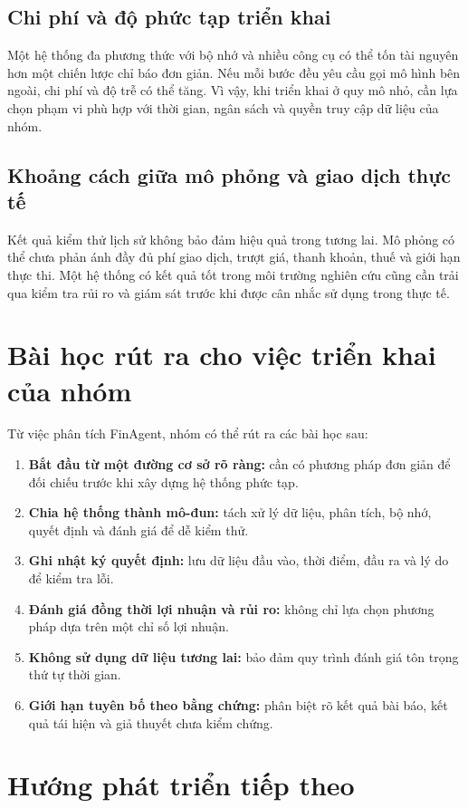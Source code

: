 \subsection{Chi phí và độ phức tạp triển khai}
Một hệ thống đa phương thức với bộ nhớ và nhiều công cụ có thể tốn tài nguyên hơn một chiến lược chỉ báo đơn giản. Nếu mỗi bước đều yêu cầu gọi mô hình bên ngoài, chi phí và độ trễ có thể tăng. Vì vậy, khi triển khai ở quy mô nhỏ, cần lựa chọn phạm vi phù hợp với thời gian, ngân sách và quyền truy cập dữ liệu của nhóm.

\subsection{Khoảng cách giữa mô phỏng và giao dịch thực tế}
Kết quả kiểm thử lịch sử không bảo đảm hiệu quả trong tương lai. Mô phỏng có thể chưa phản ánh đầy đủ phí giao dịch, trượt giá, thanh khoản, thuế và giới hạn thực thi. Một hệ thống có kết quả tốt trong môi trường nghiên cứu cũng cần trải qua kiểm tra rủi ro và giám sát trước khi được cân nhắc sử dụng trong thực tế.

\section{Bài học rút ra cho việc triển khai của nhóm}

Từ việc phân tích FinAgent, nhóm có thể rút ra các bài học sau:
\begin{enumerate}
    \item \textbf{Bắt đầu từ một đường cơ sở rõ ràng:} cần có phương pháp đơn giản để đối chiếu trước khi xây dựng hệ thống phức tạp.
    \item \textbf{Chia hệ thống thành mô-đun:} tách xử lý dữ liệu, phân tích, bộ nhớ, quyết định và đánh giá để dễ kiểm thử.
    \item \textbf{Ghi nhật ký quyết định:} lưu dữ liệu đầu vào, thời điểm, đầu ra và lý do để kiểm tra lỗi.
    \item \textbf{Đánh giá đồng thời lợi nhuận và rủi ro:} không chỉ lựa chọn phương pháp dựa trên một chỉ số lợi nhuận.
    \item \textbf{Không sử dụng dữ liệu tương lai:} bảo đảm quy trình đánh giá tôn trọng thứ tự thời gian.
    \item \textbf{Giới hạn tuyên bố theo bằng chứng:} phân biệt rõ kết quả bài báo, kết quả tái hiện và giả thuyết chưa kiểm chứng.
\end{enumerate}

\section{Hướng phát triển tiếp theo}

